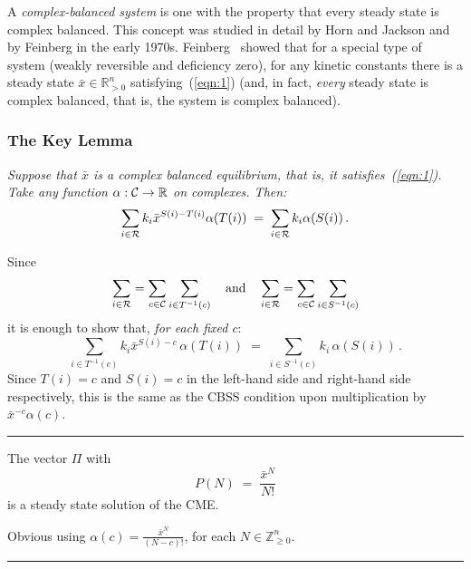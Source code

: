 \documentclass[11pt]{article}
\newcommand{\be}[1]{\begin{equation}\label{#1}}
\newcommand{\ee}{\end{equation}}
\newcommand{\R}{{\mathbb R}}  %
\newcommand{\Z}{{\mathbb Z}}  %
\newcommand{\halmos}{\rule{1ex}{1.4ex}}
\newcommand{\qed}{\hfill \halmos} %
\begin{document}
A \emph{complex-balanced system} is one with the property that every steady
state is complex balanced.  This concept was studied in detail by Horn and
Jackson and by Feinberg in the early 1970s.
Feinberg~\cite{feinberg1,feinberg2} showed that for a special type of system
(weakly reversible and deficiency zero), for any 
kinetic constants there is a steady state $\bar x\in \R^n_{>0}$
satisfying~(\ref{eqn:1}) (and, in fact, \emph{every} steady state is
complex balanced, that is, the system is complex balanced).  


\subsubsection*{The Key Lemma}

\emph{Suppose that $\bar x$ is a complex balanced equilibrium, that is,
it satisfies~(\ref{eqn:1}).
Take any function $\alpha :{\cal C}\rightarrow \R$ on complexes.  Then:}
\be{eq:2}
\sum_{i\in {\cal R}} k_i {\bar x}^{S(i)-T(i)} \alpha (T(i)) \;=\;
\sum_{i\in {\cal R}} k_i \alpha (S(i))\,.
\ee

Since
\[
\sum_{i\in {\cal R}} = \sum_{c\in {\cal C}} \sum_{i\in T^{-1}(c)}
\quad\mbox{and}\quad
\sum_{i\in {\cal R}} = \sum_{c\in {\cal C}} \sum_{i\in S^{-1}(c)}
\]
it is enough to show that, \emph{for each fixed $c$}:
\[
\sum_{i\in T^{-1}(c)} k_i {\bar x}^{S(i)-c} \,\alpha (T(i))
\;=\;
\sum_{i\in S^{-1}(c)} k_i \,\alpha (S(i))\,.
\]
Since $T(i)=c$ and $S(i)=c$ in the left-hand side and right-hand side
respectively, this is the same as the CBSS condition upon multiplication by
${\bar x}^{-c}\alpha (c)$. 
\qed

The vector $\Pi $ with 
\[
P(N)\;=\; \frac{{\bar x}^N}{N!}
\]
is a steady state solution of the CME.

  Obvious using $\alpha (c) = \frac{{\bar x}^N}{(N-c)!}$,
for each $N\in \Z^n_{\geq 0}$.
\qed
\end{document}
